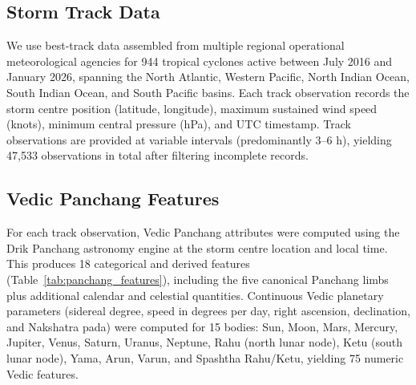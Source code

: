 \documentclass[12pt,a4paper]{article}
\begin{document}
\subsection{Storm Track Data}

We use best-track data assembled from multiple regional operational meteorological
agencies for 944 tropical cyclones active between July 2016 and January 2026,
spanning the North Atlantic, Western Pacific, North Indian Ocean, South Indian
Ocean, and South Pacific basins.
Each track observation records the storm centre position (latitude, longitude),
maximum sustained wind speed (knots), minimum central pressure (hPa), and UTC
timestamp.
Track observations are provided at variable intervals (predominantly 3--6 h),
yielding 47{,}533 observations in total after filtering incomplete records.

\subsection{Vedic Panchang Features}

For each track observation, Vedic Panchang attributes were computed using the
Drik Panchang astronomy engine at the storm centre location and local time.
This produces 18 categorical and derived features (Table~\ref{tab:panchang_features}),
including the five canonical Panchang limbs plus additional calendar and celestial
quantities.
Continuous Vedic planetary parameters (sidereal degree, speed in degrees per day,
right ascension, declination, and Nakshatra pada) were computed for 15 bodies:
Sun, Moon, Mars, Mercury, Jupiter, Venus, Saturn, Uranus, Neptune, Rahu (north
lunar node), Ketu (south lunar node), Yama, Arun, Varun, and Spashtha Rahu/Ketu,
yielding 75 numeric Vedic features.
\end{document}
